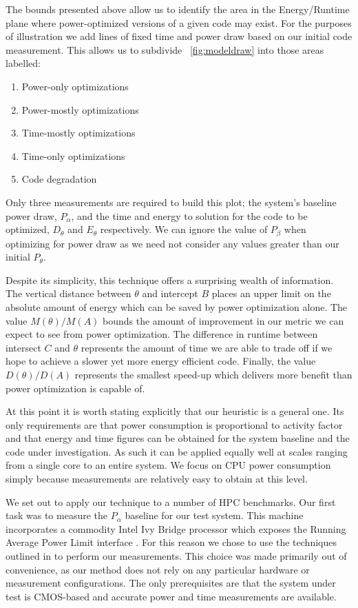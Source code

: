 The bounds presented above allow us to identify the area in the Energy/Runtime plane where power-optimized versions of a given code may exist. For the purposes of illustration we add lines of fixed time and power draw based on our initial code measurement. This allows us to subdivide \figurename~\ref{fig:modeldraw} into those areas labelled:

\begin{enumerate}
\centering
\item Power-only optimizations
\item Power-mostly optimizations
\item Time-mostly optimizations
\item Time-only optimizations
\item Code degradation
\end{enumerate}

Only three measurements are required to build this plot; the system's baseline power draw, $P_\alpha$, and the time and energy to solution for the code to be optimized, $D_\theta$ and $E_\theta$ respectively. We can ignore the value of $P_\beta$ when optimizing for power draw as we need not consider any values greater than our initial $P_\theta$.

Despite its simplicity, this technique offers a surprising wealth of information. The vertical distance between $\theta$ and intercept $B$ places an upper limit on the absolute amount of energy which can be saved by power optimization alone. The value $M(\theta) / M(A)$ bounds the amount of improvement in our metric we can expect to see from power optimization. The difference in runtime between intersect $C$ and $\theta$ represents the amount of time we are able to trade off if we hope to achieve a slower yet more energy efficient code. Finally, the value $D(\theta) / D(A)$ represents the smallest speed-up which delivers more benefit than power optimization is capable of.

At this point it is worth stating explicitly that our heuristic is a general one. Its only requirements are that power consumption is proportional to activity factor and that energy and time figures can be obtained for the system baseline and the code under investigation. As such it can be applied equally well at scales ranging from a single core to an entire system. We focus on CPU power consumption simply because measurements are relatively easy to obtain at this level.

We set out to apply our technique to a number of HPC benchmarks. Our first task was to measure the $P_\alpha$ baseline for our test system. This machine incorporates a commodity Intel Ivy Bridge processor which exposes the Running Average Power Limit interface \cite{david:2010aa}. For this reason we chose to use the techniques outlined in \cite{hackenberg:2013aa} to perform our measurements. This choice was made primarily out of convenience, as our method does not rely on any particular hardware or measurement configurations. The only prerequisites are that the system under test is CMOS-based and accurate power and time measurements are available.

